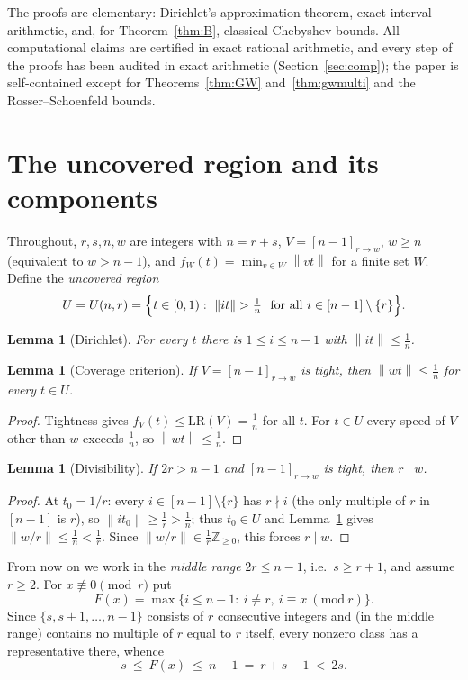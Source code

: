 \documentclass[11pt]{article}
\newtheorem{lemma}[theorem]{Lemma}
\theoremstyle{definition}
\newcommand{\LR}{\mathrm{LR}}
\newcommand{\Z}{\mathbb{Z}}
\newcommand{\norm}[1]{\left\lVert #1 \right\rVert}
\begin{document}
The proofs are elementary: Dirichlet's approximation theorem, exact interval
arithmetic, and, for Theorem~\ref{thm:B}, classical Chebyshev bounds. All
computational claims are certified in exact rational arithmetic, and every
step of the proofs has been audited in exact arithmetic (Section~\ref{sec:comp});
the paper is self-contained except for Theorems~\ref{thm:GW}
and~\ref{thm:gwmulti} and the Rosser--Schoenfeld bounds.

\section{The uncovered region and its components}\label{sec:prelim}

Throughout, $r,s,n,w$ are integers with $n=r+s$, $V=[n-1]_{r\to w}$,
$w\ge n$ (equivalent to $w>n-1$), and $f_W(t)=\min_{v\in W}\norm{vt}$ for a
finite set $W$. Define the \emph{uncovered region}
\[
U=U(n,r)=\Bigl\{t\in[0,1):\ \norm{it}>\tfrac1n\ \text{ for all }
i\in[n-1]\setminus\{r\}\Bigr\}.
\]

\begin{lemma}[Dirichlet]\label{lem:dir}
For every $t$ there is $1\le i\le n-1$ with $\norm{it}\le\frac1n$.
\end{lemma}

\begin{lemma}[Coverage criterion]\label{lem:cov}
If $V=[n-1]_{r\to w}$ is tight, then $\norm{wt}\le\frac1n$ for every
$t\in U$.
\end{lemma}

\begin{proof}
Tightness gives $f_V(t)\le\LR(V)=\frac1n$ for all $t$. For $t\in U$ every
speed of $V$ other than $w$ exceeds $\frac1n$, so $\norm{wt}\le\frac1n$.
\end{proof}

\begin{lemma}[Divisibility]\label{lem:div}
If $2r>n-1$ and $[n-1]_{r\to w}$ is tight, then $r\mid w$.
\end{lemma}

\begin{proof}
At $t_0=1/r$: every $i\in[n-1]\setminus\{r\}$ has $r\nmid i$ (the only
multiple of $r$ in $[n-1]$ is $r$), so $\norm{it_0}\ge\frac1r>\frac1n$; thus
$t_0\in U$ and Lemma~\ref{lem:cov} gives $\norm{w/r}\le\frac1n<\frac1r$.
Since $\norm{w/r}\in\frac1r\Z_{\ge0}$, this forces $r\mid w$.
\end{proof}

From now on we work in the \emph{middle range} $2r\le n-1$, i.e.\ $s\ge r+1$,
and assume $r\ge2$. For $x\not\equiv0\pmod r$ put
\[
F(x)=\max\{i\le n-1:\ i\ne r,\ i\equiv x\ (\mathrm{mod}\ r)\}.
\]
Since $\{s,s+1,\dots,n-1\}$ consists of $r$ consecutive integers and (in the
middle range) contains no multiple of $r$ equal to $r$ itself, every nonzero
class has a representative there, whence
\begin{equation}\label{eq:Fges}
s\ \le\ F(x)\ \le\ n-1\ =\ r+s-1\ <\ 2s .
\end{equation}
\end{document}
